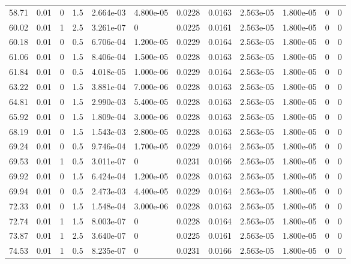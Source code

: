 \documentclass[preview]{standalone}
\begin{document}
{{{\begin{tabular}{L{1.2cm}C{1.2cm} C{0.3cm}C{0.5cm} C{1.4cm}C{1.4cm} C{1.4cm}C{1.4cm} C{1.6cm}C{1.6cm} C{1.6cm}C{1.6cm}}
  58.71  &  0.01  & 0     & 1.5 &  2.664e-03  & 4.800e-05  &  0.0228&   0.0163& 2.563e-05 & 1.800e-05   &  0 & 0  \\ 
  60.02  &  0.01  & 1     & 2.5 &  3.261e-07  & 0  &  0.0225&   0.0161& 2.563e-05 & 1.800e-05   &  0 & 0  \\ 
  60.18  &  0.01  & 0     & 0.5 &  6.706e-04  & 1.200e-05  &  0.0229&   0.0164& 2.563e-05 & 1.800e-05   &  0 & 0  \\ 
  61.06  &  0.01  & 0     & 1.5 &  8.406e-04  & 1.500e-05  &  0.0228&   0.0163& 2.563e-05 & 1.800e-05   &  0 & 0  \\ 
  61.84  &  0.01  & 0     & 0.5 &  4.018e-05  & 1.000e-06  &  0.0229&   0.0164& 2.563e-05 & 1.800e-05   &  0 & 0  \\ 
  63.22  &  0.01  & 0     & 1.5 &  3.881e-04  & 7.000e-06  &  0.0228&   0.0163& 2.563e-05 & 1.800e-05   &  0 & 0  \\ 
  64.81  &  0.01  & 0     & 1.5 &  2.990e-03  & 5.400e-05  &  0.0228&   0.0163& 2.563e-05 & 1.800e-05   &  0 & 0  \\ 
  65.92  &  0.01  & 0     & 1.5 &  1.809e-04  & 3.000e-06  &  0.0228&   0.0163& 2.563e-05 & 1.800e-05   &  0 & 0  \\ 
  68.19  &  0.01  & 0     & 1.5 &  1.543e-03  & 2.800e-05  &  0.0228&   0.0163& 2.563e-05 & 1.800e-05   &  0 & 0  \\ 
  69.24  &  0.01  & 0     & 0.5 &  9.746e-04  & 1.700e-05  &  0.0229&   0.0164& 2.563e-05 & 1.800e-05   &  0 & 0  \\ 
  69.53  &  0.01  & 1     & 0.5 &  3.011e-07  & 0  &  0.0231&   0.0166& 2.563e-05 & 1.800e-05   &  0 & 0  \\ 
  69.92  &  0.01  & 0     & 1.5 &  6.424e-04  & 1.200e-05  &  0.0228&   0.0163& 2.563e-05 & 1.800e-05   &  0 & 0  \\ 
  69.94  &  0.01  & 0     & 0.5 &  2.473e-03  & 4.400e-05  &  0.0229&   0.0164& 2.563e-05 & 1.800e-05   &  0 & 0  \\ 
  72.33  &  0.01  & 0     & 1.5 &  1.548e-04  & 3.000e-06  &  0.0228&   0.0163& 2.563e-05 & 1.800e-05   &  0 & 0  \\ 
  72.74  &  0.01  & 1     & 1.5 &  8.003e-07  & 0  &  0.0228&   0.0164& 2.563e-05 & 1.800e-05   &  0 & 0  \\ 
  73.87  &  0.01  & 1     & 2.5 &  3.640e-07  & 0  &  0.0225&   0.0161& 2.563e-05 & 1.800e-05   &  0 & 0  \\ 
  74.53  &  0.01  & 1     & 0.5 &  8.235e-07  & 0  &  0.0231&   0.0166& 2.563e-05 & 1.800e-05   &  0 & 0  \\ 

\end{tabular}}}}
\end{document}
